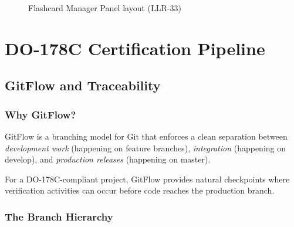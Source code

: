 \documentclass[12pt,oneside]{book}
\begin{document}
\begin{figure}[H]
\centering
{}
\caption{Flashcard Manager Panel layout (LLR-33)}
\end{figure}

\part{DO-178C Certification Pipeline}

\chapter{GitFlow and Traceability}
\label{ch:gitflow}

\section{Why GitFlow?}

GitFlow is a branching model for Git that enforces a clean separation between
\textit{development work} (happening on feature branches), \textit{integration}
(happening on develop), and \textit{production releases} (happening on master).

For a DO-178C-compliant project, GitFlow provides natural checkpoints where
verification activities can occur before code reaches the production branch.

\section{The Branch Hierarchy}
\end{document}
